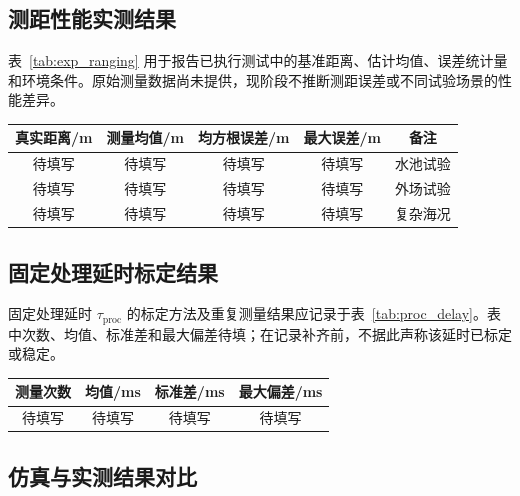 \subsection{测距性能实测结果}

表~\ref{tab:exp_ranging} 用于报告已执行测试中的基准距离、估计均值、误差统计量和环境条件。原始测量数据尚未提供，现阶段不推断测距误差或不同试验场景的性能差异。

\begin{table}[htbp]
  \vspace{0.5em}\centering\wuhao
  \begin{tabular}{ccccc}
    \toprule[1.5pt]
    真实距离/m & 测量均值/m & 均方根误差/m & 最大误差/m & 备注 \\
    \midrule[1pt]
    待填写 & 待填写 & 待填写 & 待填写 & 水池试验 \\
    待填写 & 待填写 & 待填写 & 待填写 & 外场试验 \\
    待填写 & 待填写 & 待填写 & 待填写 & 复杂海况 \\
    \bottomrule[1.5pt]
  \end{tabular}
\end{table}

\subsection{固定处理延时标定结果}

固定处理延时 $\tau_{\mathrm{proc}}$ 的标定方法及重复测量结果应记录于表~\ref{tab:proc_delay}。表中次数、均值、标准差和最大偏差待填；在记录补齐前，不据此声称该延时已标定或稳定。

\begin{table}[htbp]
  \vspace{0.5em}\centering\wuhao
  \begin{tabular}{cccc}
    \toprule[1.5pt]
    测量次数 & 均值/ms & 标准差/ms & 最大偏差/ms \\
    \midrule[1pt]
    待填写 & 待填写 & 待填写 & 待填写 \\
    \bottomrule[1.5pt]
  \end{tabular}
\end{table}

\subsection{仿真与实测结果对比}

